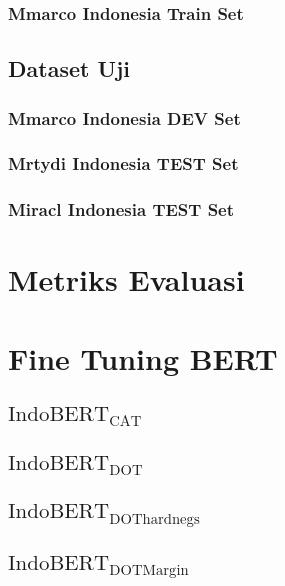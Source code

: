 \subsubsection{Mmarco Indonesia Train Set}


\subsection{Dataset Uji}
\label{sec:datasetuji}

\subsubsection{Mmarco Indonesia DEV Set}
\label{sec:mmarcodev}

\subsubsection{Mrtydi Indonesia TEST Set}
\label{sec:mrtyditest}

\subsubsection{Miracl Indonesia TEST Set}
\label{sec:miracltest}

\section{Metriks Evaluasi}
\label{sec:metriksbab4}


\section{Fine Tuning BERT}
\label{sec:finetuning}

\subsection{$\text{IndoBERT}_{\text{CAT}}$}

\subsection{$\text{IndoBERT}_{\text{DOT}}$}

\subsection{$\text{IndoBERT}_{\text{DOThardnegs}}$}

\subsection{$\text{IndoBERT}_{\text{DOTMargin}}$}

